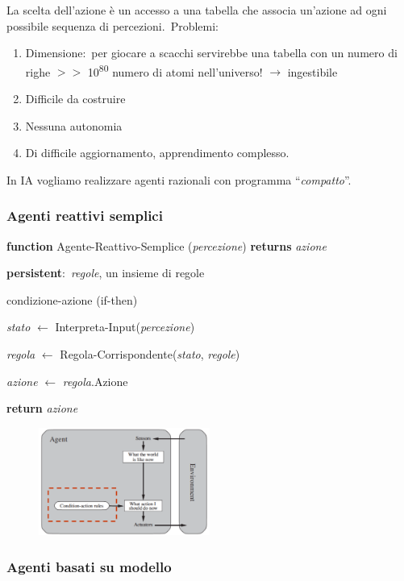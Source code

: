 La scelta dell'azione è un accesso a una tabella che associa un'azione ad ogni possibile sequenza di percezioni.\
Problemi:
\begin{enumerate}
	\item Dimensione:\ per giocare a scacchi servirebbe una tabella con un numero di righe $>>$ 10\textsuperscript{80} numero di atomi nell'universo! $\rightarrow$ ingestibile
	\item Difficile da costruire
	\item Nessuna autonomia
	\item Di difficile aggiornamento, apprendimento complesso.
\end{enumerate}

\noindent In IA vogliamo realizzare agenti razionali con programma ``\textit{compatto}''.

\subsubsection{Agenti reattivi semplici}
\textbf{function} Agente-Reattivo-Semplice (\textit{percezione}) \textbf{returns} \textit{azione}

\textbf{persistent}:\ \textit{regole}, un insieme di regole

condizione-azione (if-then)

\textit{stato} $\leftarrow$ Interpreta-Input(\textit{percezione})

\textit{regola} $\leftarrow$ Regola-Corrispondente(\textit{stato}, \textit{regole})

\textit{azione} $\leftarrow$ \textit{regola}.Azione

\textbf{return} \textit{azione}

\begin{figure}[H]
	\centering
	\includegraphics[width=0.5\textwidth]{immagini/Agenti_reattivi.png}
\end{figure}

\subsubsection{Agenti basati su modello}

